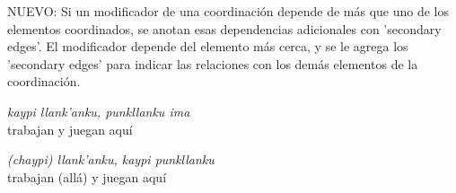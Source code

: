 \documentclass[a4paper,11pt,DIV12]{scrartcl}
\begin{document}
NUEVO: Si un modificador de una coordinaci\'on depende de m\'as que uno de los elementos coordinados, se anotan esas dependencias adicionales con 'secondary edges'. El modificador depende del elemento m\'as cerca, y se le agrega los 'secondary edges' para indicar las relaciones con los dem\'as elementos de la coordinaci\'on.
\begin{center}
 \begin{minipage}{0.4\textwidth}
 \begin{examples}
 \item\label{Ex:coloc} {\em kaypi llank'anku, punkllanku ima}\\
      trabajan y juegan aqu\'i
  \item\label{Ex:locco} {\em (chaypi) llank'anku,  kaypi punkllanku}\\
      trabajan (all\'a) y juegan aqu\'i
\end{examples}
\end{minipage}
% 
\hfill
\begin{minipage}{0.5\textwidth}
\begin{center}\fbox{
}
\end{center}
\end{minipage}
\end{center}
\end{document}
